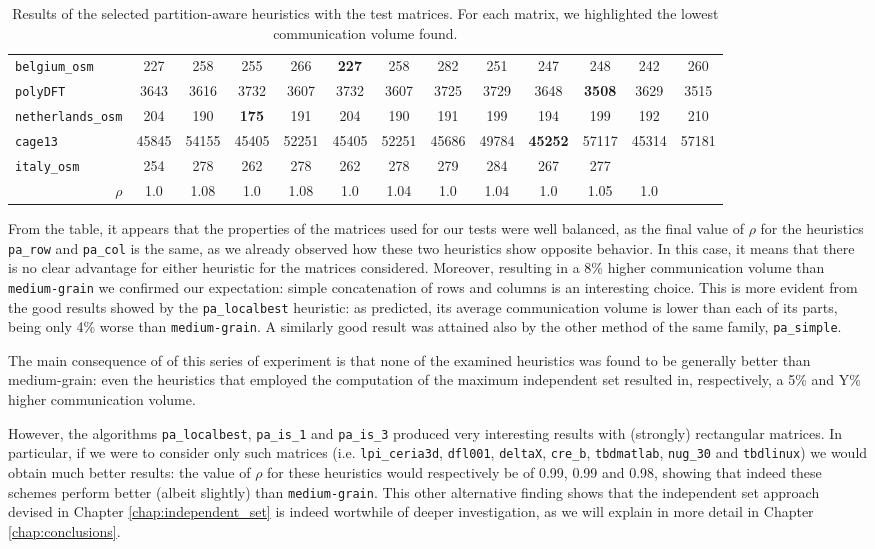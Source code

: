 \begin{table}
\begin{tabular}{|l|c|c||c|c||c|c||c|c||c|c||c|c|}
	\verb|belgium_osm| & 227 & 258 & 255 & 266 & \textbf{227} & 258 &  282 & 251 & 247 & 248 & 242 & 260 \\
	\verb|polyDFT| & 3643 & 3616 & 3732 & 3607 & 3732 &  3607 & 3725 & 3729 & 3648 & \textbf{3508} & 3629 & 3515 \\
	\verb|netherlands_osm| & 204 & 190 & \textbf{175} & 191 & 204 & 190 & 191 & 199 & 194 & 199 & 192 & 210 \\
	\verb|cage13| & 45845 & 54155 & 45405 & 52251 & 45405 & 52251 & 45686 & 49784 & \textbf{45252} & 57117 & 45314 & 57181\\
	\verb|italy_osm| & 254 & 278 & 262 & 278 &262 & 278 & 279 & 284 & 267 & 277 & &  \\ \hline
	\multicolumn{1}{|r|}{$\rho$}	& 1.0  & 1.08 & 1.0  & 1.08 & 1.0  & 1.04 & 1.0  & 1.04 & 1.0  & 1.05 & 1.0  & \\ \hline
		\end{tabular}
	\caption{Results of the selected partition-aware heuristics with the test matrices. For each matrix, we highlighted the lowest communication volume found.} \label{tab:final_pa}
\end{table}

From the table, it appears that the properties of the matrices used for our tests were well balanced, as the final value of $\rho$ for the heuristics \verb|pa_row| and \verb|pa_col| is the same, as we already observed how these two heuristics show opposite behavior. In this case, it means that there is no clear advantage for either heuristic for the matrices considered. Moreover, resulting in a 8\% higher communication volume than \verb|medium-grain| we confirmed our expectation: simple concatenation of rows and columns is an interesting choice. This is more evident from the good results showed by the \verb|pa_localbest| heuristic: as predicted, its average communication volume is lower than each of its parts, being only 4\% worse than \verb|medium-grain|. A similarly good result was attained also by the other method of the same family, \verb|pa_simple|.

The main consequence of of this series of experiment is that none of the examined heuristics was found to be generally better than medium-grain: even the heuristics that employed the computation of the maximum independent set resulted in, respectively, a 5\% and Y\% higher communication volume. 

However, the algorithms \verb|pa_localbest|, \verb|pa_is_1| and \verb|pa_is_3| produced very interesting results with (strongly) rectangular matrices. In particular, if we were to consider only such matrices (i.e. \verb|lpi_ceria3d|, \verb|dfl001|, \verb|deltaX|, \verb|cre_b|, \verb|tbdmatlab|, \verb|nug_30| and \verb|tbdlinux|) we would obtain much better results: the value of $\rho$ for these heuristics would respectively be of 0.99, 0.99 and 0.98, showing that indeed these schemes perform better (albeit slightly) than \verb|medium-grain|. This other alternative finding shows that the independent set approach devised in Chapter \ref{chap:independent_set} is indeed wortwhile of deeper investigation, as we will explain in more detail in Chapter \ref{chap:conclusions}.

